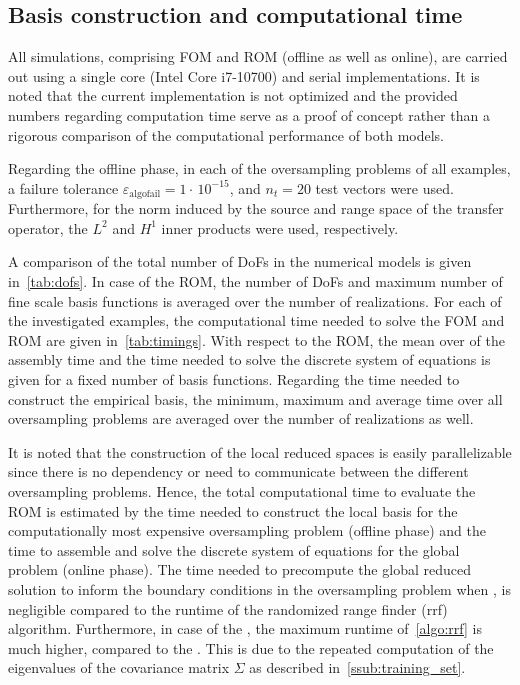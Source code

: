 \documentclass[AMA,STIX1COL,doublespace]{WileyNJD-v2}
\begin{document}
\subsection{Basis construction and computational time}%
\label{sub:computational_time}

All simulations, comprising FOM and ROM (offline as well as online), are carried out using a single core (Intel Core i7-10700) and serial implementations.
It is noted that the current implementation is not optimized and the provided numbers regarding computation time serve as a proof of concept rather than a rigorous comparison of the computational performance of both models.

Regarding the offline phase, in each of the oversampling problems of all examples, a failure tolerance $\varepsilon_{\mathrm{algofail}}=1\cdot\,10^{-15}$, and $n_t=20$ test vectors were used.
Furthermore, for the norm induced by the source and range space of the transfer operator, the $L^2$ and $H^1$ inner products were used, respectively.

A comparison of the total number of DoFs in the numerical models is given 
in~\cref{tab:dofs}.
In case of the ROM, the number of DoFs and maximum number of fine scale basis
functions is averaged over the number of realizations.
For each of the investigated examples, the computational time needed to solve
the FOM and ROM are given in~\cref{tab:timings}.
With respect to the ROM, the mean over 
of the assembly time and the time needed to solve the discrete system of
equations is given for a fixed number of basis functions.
Regarding the time needed to construct the empirical basis, the minimum, maximum 
and average time over all oversampling problems are averaged over the number of 
realizations as well.

It is noted that the construction of the local reduced spaces is easily
parallelizable since there is no dependency or need to communicate between
the different oversampling problems.
Hence, the total computational time to evaluate the ROM is estimated by the
time needed to construct the local basis
for the computationally most expensive oversampling problem
(offline phase) and the time to assemble and solve the discrete system
of equations for the global problem (online phase).
The time needed to precompute the global reduced solution to inform the boundary
conditions in the oversampling problem when ,
is negligible compared to the runtime of the randomized range finder (rrf)
algorithm.
Furthermore, in case of the ,
the maximum runtime of~\cref{algo:rrf} is much higher, compared to the
.
This is due to the repeated computation of the eigenvalues of the covariance
matrix $\bm{\varSigma}$ as described in~\cref{ssub:training_set}.
\end{document}
